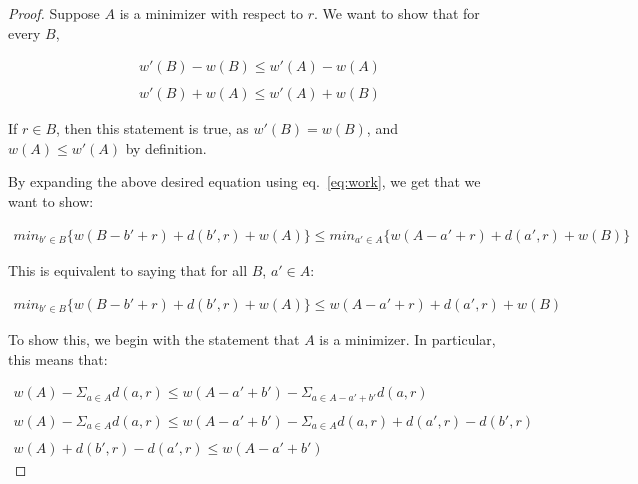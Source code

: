 \begin{proof}
    Suppose $A$ is a minimizer with respect to $r$. We want to show that for every $B$,

    \begin{equation*}
        \begin{gathered}
            w'(B) - w(B) \leq w'(A) - w(A) \\ \\
            w'(B) + w(A) \leq w'(A) + w(B)
        \end{gathered}
    \end{equation*}

    If $r \in B$, then this statement is true, as $w'(B) = w(B)$, and $w(A) \leq w'(A)$ by definition.

    By expanding the above desired equation using eq.~\ref{eq:work}, we get that we want to show:

    \begin{equation*}
        \begin{gathered}
            min_{b' \in B} \{ w(B - b' + r) + d(b', r) + w(A)\} \leq min_{a' \in A} \{ w(A - a' + r) + d(a', r) + w(B)\}
        \end{gathered}
    \end{equation*}

    This is equivalent to saying that for all $B$, $a' \in A$: 

    \begin{equation*}
        \begin{gathered}
            min_{b' \in B} \{ w(B - b' + r) + d(b', r) + w(A)\} \leq w(A - a' + r) + d(a', r) + w(B)
        \end{gathered}
    \end{equation*}

    To show this, we begin with the statement that $A$ is a minimizer. In particular, this means that:

    \begin{equation*}
        \begin{gathered}
            w(A) - \Sigma_{a \in A} d(a,r) \leq w(A -a' + b') - \Sigma_{a \in A - a' + b'} d(a,r) \\ \\
            w(A) - \Sigma_{a \in A} d(a,r) \leq w(A -a' + b') - \Sigma_{a \in A} d(a,r) + d(a', r) - d(b', r) \\ \\
            w(A) + d(b', r) - d(a', r) \leq w(A - a' + b')
        \end{gathered}
    \end{equation*}


\end{proof}
